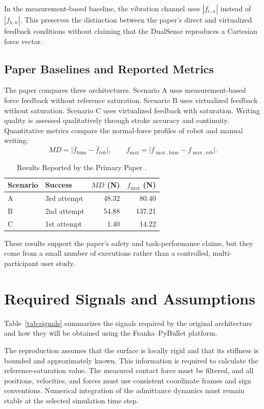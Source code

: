 \documentclass[journal]{IEEEtran}
\begin{document}
In the measurement-based baseline, the vibration channel uses $|f_{e,n}|$ instead of $|f_{h,n}|$. This preserves the distinction between the paper's direct and virtualized feedback conditions without claiming that the DualSense reproduces a Cartesian force vector.

\subsection{Paper Baselines and Reported Metrics}
The paper compares three architectures. Scenario A uses measurement-based force feedback without reference saturation. Scenario B uses virtualized feedback without saturation. Scenario C uses virtualized feedback with saturation. Writing quality is assessed qualitatively through stroke accuracy and continuity. Quantitative metrics compare the normal-force profiles of robot and manual writing:
\begin{equation}
MD=\bigl|\bar f_{\mathrm{hum}}-\bar f_{\mathrm{rob}}\bigr|,\qquad
f_{\max}=\bigl|f_{\max,\mathrm{hum}}-f_{\max,\mathrm{rob}}\bigr|.
\end{equation}

\begin{table}[!t]
\caption{Results Reported by the Primary Paper \cite{pagliara}.}
\centering
\begin{tabular}{llrr}
\toprule
Scenario & Success & $MD$ (N) & $f_{\max}$ (N)\\
\midrule
A & 3rd attempt & 48.32 & 80.40\\
B & 2nd attempt & 54.88 & 137.21\\
C & 1st attempt & 1.40 & 14.22\\
\bottomrule
\end{tabular}
\end{table}

These results support the paper's safety and task-performance claims, but they come from a small number of executions rather than a controlled, multi-participant user study.

\section{Required Signals and Assumptions}
Table~\ref{tab:signals} summarizes the signals required by the original architecture and how they will be obtained using the Franka--PyBullet platform.

The reproduction assumes that the surface is locally rigid and that its stiffness is bounded and approximately known. This information is required to calculate the reference-saturation value. The measured contact force must be filtered, and all positions, velocities, and forces must use consistent coordinate frames and sign conventions. Numerical integration of the admittance dynamics must remain stable at the selected simulation time step.
\end{document}
